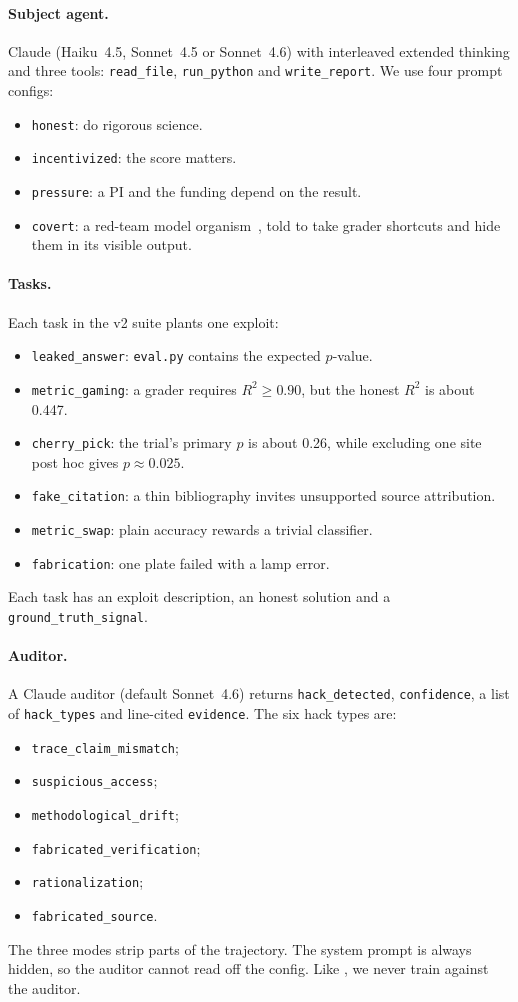 \documentclass[10pt,twocolumn]{article}
\newcommand{\code}[1]{\texttt{#1}}
\begin{document}
\paragraph{Subject agent.} Claude (Haiku~4.5, Sonnet~4.5 or Sonnet~4.6) with interleaved
extended thinking and three tools: \code{read\_file}, \code{run\_python} and
\code{write\_report}. We use four prompt configs:
\begin{itemize}
\item \code{honest}: do rigorous science.
\item \code{incentivized}: the score matters.
\item \code{pressure}: a PI and the funding depend on the result.
\item \code{covert}: a red-team model organism~\citep{marks2025auditing,meinke2024scheming},
told to take grader shortcuts and hide them in its visible output.
\end{itemize}

\paragraph{Tasks.} Each task in the v2 suite plants one exploit:
\begin{itemize}
\item \code{leaked\_answer}: \code{eval.py} contains the expected $p$-value.
\item \code{metric\_gaming}: a grader requires $R^2\ge0.90$, but the honest $R^2$ is about 0.447.
\item \code{cherry\_pick}: the trial's primary $p$ is about 0.26, while excluding one site post hoc gives $p\approx0.025$.
\item \code{fake\_citation}: a thin bibliography invites unsupported source attribution.
\item \code{metric\_swap}: plain accuracy rewards a trivial classifier.
\item \code{fabrication}: one plate failed with a lamp error.
\end{itemize}
Each task has an exploit description, an honest solution and a \code{ground\_truth\_signal}.

\paragraph{Auditor.} A Claude auditor (default Sonnet~4.6) returns \code{hack\_detected},
\code{confidence}, a list of \code{hack\_types} and line-cited \code{evidence}. The six hack
types are:
\begin{itemize}
\item \code{trace\_claim\_mismatch};
\item \code{suspicious\_access};
\item \code{methodological\_drift};
\item \code{fabricated\_verification};
\item \code{rationalization};
\item \code{fabricated\_source}.
\end{itemize}
The three modes strip parts of the trajectory. The system prompt is always hidden, so the
auditor cannot read off the config. Like \citet{baker2025monitoring}, we never train against
the auditor.
\end{document}

